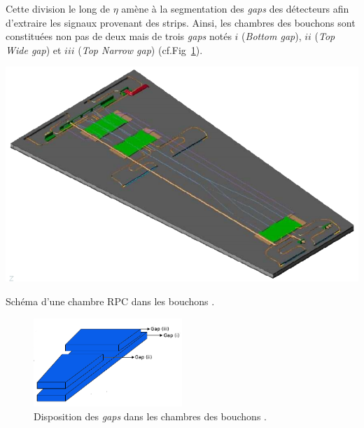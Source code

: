 Cette division le long de $\eta$ amène à la segmentation des \textit{gaps} des détecteurs afin d'extraire les signaux provenant des strips. Ainsi, les chambres des bouchons sont constituées non pas de deux mais de trois \textit{gaps} notés $i$ (\textit{Bottom gap}), $ii$ (\textit{Top Wide gap}) et $iii$ (\textit{Top Narrow gap})
 (cf.Fig~\ref{gapslayout}). 
\marginpar
{
	\centering
	\includegraphics[width=\marginparwidth]{RPC/schemerpc.png}
	\captionsetup{type=subfigure}\caption{Schéma d'une chambre RPC dans les bouchons \cite{Tytgat:1477019}.}
	\label{trap}
}
\begin{figure}[ht!]
	\centering
	\includegraphics[width=0.50\textwidth]{RPC/gaps.png}
	\captionsetup{type=subfigure}\caption{Disposition des \textit{gaps} dans les chambres des bouchons \cite{gapss}.}
	\label{gapslayout}
\end{figure}

\vspace{-0.8cm}
